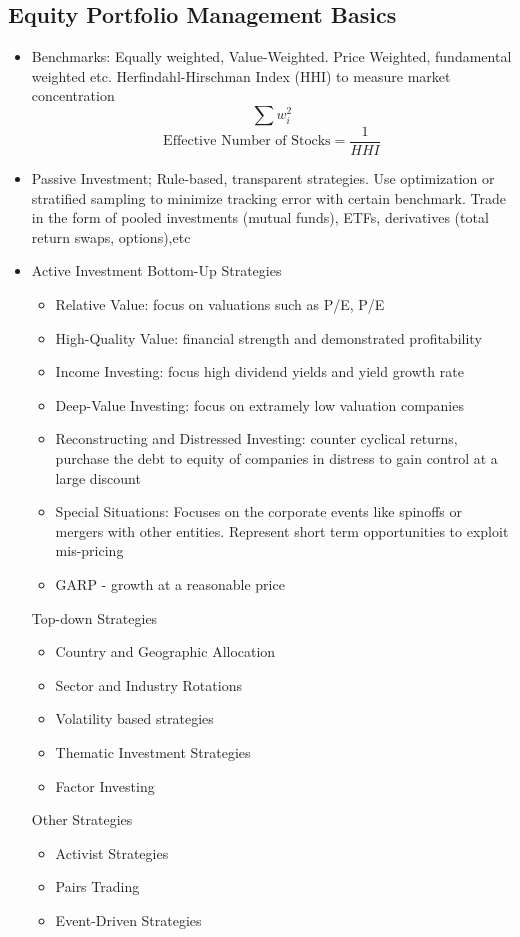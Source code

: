 \documentclass[11pt, openany]{book}              %
\begin{document}
\subsection{Equity Portfolio Management Basics}
\begin{itemize}
	\item Benchmarks: Equally weighted, Value-Weighted. Price Weighted, fundamental weighted etc.
	\subitem Herfindahl-Hirschman Index (HHI) to measure market concentration $$ \sum w_i^2 $$ $$ \text{Effective Number of Stocks} = \frac{1}{HHI}$$
	\item Passive Investment; Rule-based, transparent strategies. Use optimization or stratified sampling to minimize tracking error with certain benchmark. Trade in the form of pooled investments (mutual funds), ETFs, derivatives (total return swaps, options),etc
	\item Active Investment
	\subitem Bottom-Up Strategies
	\begin{itemize}
		\item Relative Value: focus on valuations such as P/E, P/E
		\item High-Quality Value: financial strength and demonstrated profitability
		\item Income Investing: focus high dividend yields and yield growth rate
		\item Deep-Value Investing: focus on extramely low valuation companies
		\item Reconstructing and Distressed Investing: counter cyclical returns, purchase the debt to equity of companies in distress to gain control at a large discount
		\item Special Situations: Focuses on the corporate events like spinoffs or mergers with other entities. Represent short term opportunities to exploit mis-pricing
		\item GARP - growth at a reasonable price
	\end{itemize}
	\subitem Top-down Strategies
	\begin{itemize}
		\item Country and Geographic Allocation
		\item Sector and Industry Rotations
		\item Volatility based strategies
		\item Thematic Investment Strategies
		\item Factor Investing 
	\end{itemize}
	\subitem Other Strategies
	\begin{itemize}
		\item Activist Strategies
		\item Pairs Trading
		\item Event-Driven Strategies
	\end{itemize}
\end{itemize}
\end{document}
